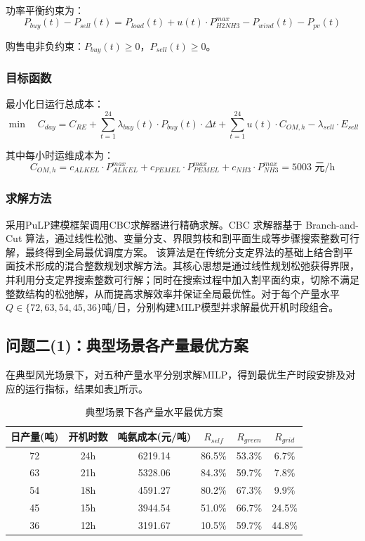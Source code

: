 功率平衡约束为：
\begin{equation}
P_{buy}(t) - P_{sell}(t) = P_{load}(t) + u(t) \cdot P_{H2NH3}^{max} - P_{wind}(t) - P_{pv}(t)
\end{equation}

购售电非负约束：$P_{buy}(t) \geq 0$，$P_{sell}(t) \geq 0$。

\subsubsection{目标函数}

最小化日运行总成本：
\begin{equation}\label{eq:q2_obj}
\min \quad C_{day} = C_{RE} + \sum_{t=1}^{24} \lambda_{buy}(t) \cdot P_{buy}(t) \cdot \Delta t + \sum_{t=1}^{24} u(t) \cdot C_{OM,h} - \lambda_{sell} \cdot E_{sell}
\end{equation}

其中每小时运维成本为：
\begin{equation}
C_{OM,h} = c_{ALKEL} \cdot P_{ALKEL}^{max} + c_{PEMEL} \cdot P_{PEMEL}^{max} + c_{NH3} \cdot P_{NH3}^{max} = 5003 \text{ 元/h}
\end{equation}

\subsubsection{求解方法}

采用PuLP建模框架调用CBC求解器进行精确求解。CBC 求解器基于 Branch-and-Cut 算法，通过线性松弛、变量分支、界限剪枝和割平面生成等步骤搜索整数可行解，最终得到全局最优调度方案。
该算法是在传统分支定界法的基础上结合割平面技术形成的混合整数规划求解方法。其核心思想是通过线性规划松弛获得界限，并利用分支定界搜索整数可行解；同时在搜索过程中加入割平面约束，切除不满足整数结构的松弛解，从而提高求解效率并保证全局最优性。对于每个产量水平$Q \in \{72, 63, 54, 45, 36\}$吨/日，分别构建MILP模型并求解最优开机时段组合。

\subsection{问题二(1)：典型场景各产量最优方案}

在典型风光场景下，对五种产量水平分别求解MILP，得到最优生产时段安排及对应的运行指标，结果如表\ref{tab:q2_typical}所示。

\begin{table}[H]
\centering
\caption{典型场景下各产量水平最优方案}\label{tab:q2_typical}
\begin{tabular}{cccccc}
\toprule
日产量(吨) & 开机时数 & 吨氨成本(元/吨) & $R_{self}$ & $R_{green}$ & $R_{grid}$ \\
\midrule
72 & 24h & 6219.14 & 86.5\% & 53.3\% & 6.7\% \\
63 & 21h & 5328.06 & 84.3\% & 59.7\% & 7.8\% \\
54 & 18h & 4591.27 & 80.2\% & 67.3\% & 9.9\% \\
45 & 15h & 3944.54 & 51.0\% & 66.7\% & 24.5\% \\
36 & 12h & 3191.67 & 10.5\% & 59.7\% & 44.8\% \\
\bottomrule
\end{tabular}
\end{table}

